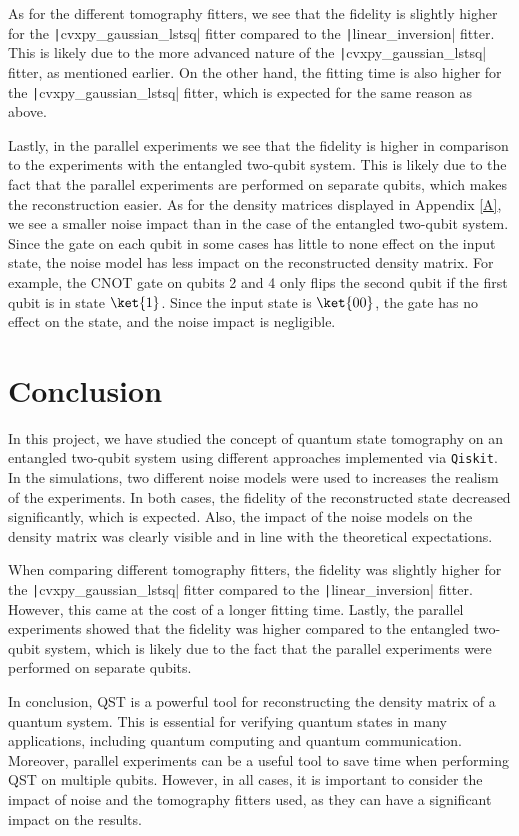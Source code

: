 \documentclass[a4paper,12pt]{article}
\begin{document}
As for the different tomography fitters, we see that the fidelity is slightly higher for the \texttt|cvxpy_gaussian_lstsq| fitter compared to the \texttt|linear_inversion| fitter. This is likely due to the more advanced nature of the \texttt|cvxpy_gaussian_lstsq| fitter, as mentioned earlier. On the other hand, the fitting time is also higher for the \texttt|cvxpy_gaussian_lstsq| fitter, which is expected for the same reason as above.

Lastly, in the parallel experiments we see that the fidelity is higher in comparison to the experiments with the entangled two-qubit system. This is likely due to the fact that the parallel experiments are performed on separate qubits, which makes the reconstruction easier. As for the density matrices displayed in Appendix \ref{A}, we see a smaller noise impact than in the case of the entangled two-qubit system. Since the gate on each qubit in some cases has little to none effect on the input state, the noise model has less impact on the reconstructed density matrix. For example, the CNOT gate on qubits 2 and 4 only flips the second qubit if the first qubit is in state $\ket{1}$. Since the input state is $\ket{00}$, the gate has no effect on the state, and the noise impact is negligible.

\section{Conclusion}
In this project, we have studied the concept of quantum state tomography on an entangled two-qubit system using different approaches implemented via \texttt{Qiskit}. In the simulations, two different noise models were used to increases the realism of the experiments. In both cases, the fidelity of the reconstructed state decreased significantly, which is expected. Also, the impact of the noise models on the density matrix was clearly visible and in line with the theoretical expectations.

When comparing different tomography fitters, the fidelity was slightly higher for the \texttt|cvxpy_gaussian_lstsq| fitter compared to the \texttt|linear_inversion| fitter. However, this came at the cost of a longer fitting time. Lastly, the parallel experiments showed that the fidelity was higher compared to the entangled two-qubit system, which is likely due to the fact that the parallel experiments were performed on separate qubits.

In conclusion, QST is a powerful tool for reconstructing the density matrix of a quantum system. This is essential for verifying quantum states in many applications, including quantum computing and quantum communication. Moreover, parallel experiments can be a useful tool to save time when performing QST on multiple qubits. However, in all cases, it is important to consider the impact of noise and the tomography fitters used, as they can have a significant impact on the results.
\end{document}

